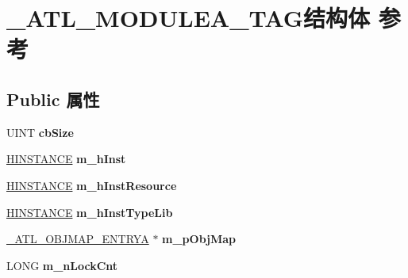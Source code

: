 \hypertarget{struct___a_t_l___m_o_d_u_l_e_a___t_a_g}{}\section{\+\_\+\+A\+T\+L\+\_\+\+M\+O\+D\+U\+L\+E\+A\+\_\+\+T\+A\+G结构体 参考}
\label{struct___a_t_l___m_o_d_u_l_e_a___t_a_g}
\subsection*{Public 属性}
\begin{DoxyCompactItemize}
\item 
\mbox{\label{struct___a_t_l___m_o_d_u_l_e_a___t_a_g_a6f0556a87737adf8853162d90d6d15a5}} 
U\+I\+NT {\bfseries cb\+Size}
\item 
\mbox{\label{struct___a_t_l___m_o_d_u_l_e_a___t_a_g_a3ebe842fced75d0a5701929649833d44}} 
\hyperlink{interfacevoid}{H\+I\+N\+S\+T\+A\+N\+CE} {\bfseries m\+\_\+h\+Inst}
\item 
\mbox{\label{struct___a_t_l___m_o_d_u_l_e_a___t_a_g_ab0425ecc55e3dc4825a65c133bb62750}} 
\hyperlink{interfacevoid}{H\+I\+N\+S\+T\+A\+N\+CE} {\bfseries m\+\_\+h\+Inst\+Resource}
\item 
\mbox{\label{struct___a_t_l___m_o_d_u_l_e_a___t_a_g_ad560455148e5adf0863075d59341278b}} 
\hyperlink{interfacevoid}{H\+I\+N\+S\+T\+A\+N\+CE} {\bfseries m\+\_\+h\+Inst\+Type\+Lib}
\item 
\mbox{\label{struct___a_t_l___m_o_d_u_l_e_a___t_a_g_a55a2a7c31cd3378027db67550377b723}} 
\hyperlink{struct___a_t_l___o_b_j_m_a_p___e_n_t_r_y_a___t_a_g}{\+\_\+\+A\+T\+L\+\_\+\+O\+B\+J\+M\+A\+P\+\_\+\+E\+N\+T\+R\+YA} $\ast$ {\bfseries m\+\_\+p\+Obj\+Map}
\item 
\mbox{\label{struct___a_t_l___m_o_d_u_l_e_a___t_a_g_a3a3df34a4cfb0f94916ba445370064b6}} 
L\+O\+NG {\bfseries m\+\_\+n\+Lock\+Cnt}
\item 
\mbox{\label{struct___a_t_l___m_o_d_u_l_e_a___t_a_g_ae561679301c5a5911671448149b22908}} 

\end{DoxyCompactItemize}
